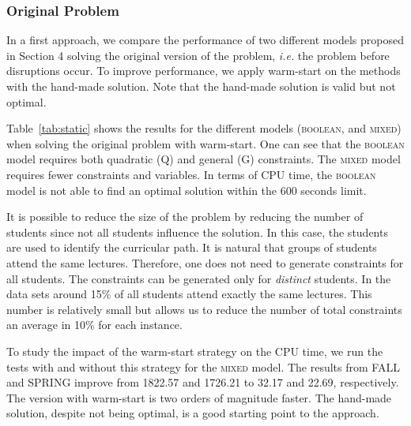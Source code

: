 \documentclass[runningheads]{llncs}
\begin{document}
\subsubsection{Original Problem} In a first approach, we compare the performance of two different models proposed in Section 4 solving the original version of the problem, \emph{i.e.} the problem before disruptions occur. To improve performance, we apply warm-start on the methods with the hand-made solution. Note that the hand-made solution is valid but not optimal. 

Table~\ref{tab:static} shows the results for the different models (\textsc{boolean}, and \textsc{mixed}) when solving the original problem with warm-start. One can see that the \textsc{boolean} model requires both quadratic (Q) and general (G) constraints. The \textsc{mixed} model requires fewer constraints and variables. In terms of CPU time, the \textsc{boolean} model is not able to find an optimal solution within the 600 seconds limit. %

It is possible to reduce the size of the problem by reducing the number of students since not all students influence the solution. In this case, the students are used to identify the curricular path. It is natural that groups of students attend the same lectures. Therefore, one does not need to generate constraints for all students. The constraints can be generated only for \textit{distinct} students. In the data sets around 15\% of all students attend exactly the same lectures. This number is relatively small but allows us to reduce the number of total constraints an average in 10\% for each instance. 

To study the impact of the warm-start strategy on the CPU time, we run the tests with and without this strategy for the \textsc{mixed} model. The results from \textsc{FALL} and \textsc{SPRING} improve from 1822.57 and 1726.21 to 32.17 and 22.69, respectively.  The version with warm-start is two orders of magnitude faster. The hand-made solution, despite not being optimal, is a good starting point to the approach. 
\end{document}
